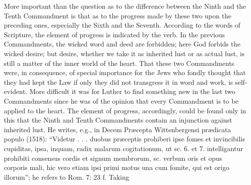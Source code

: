 More important than the question as to the difference between the Ninth and the Tenth Commandment is that as to the progress made by these two upon the preceding ones, especially the Sixth and the Seventh. According to the words of Scripture, the element of progress is indicated by the verb. In the previous Commandments, the wicked word and deed are forbidden; here God forbids the wicked desire; but desire, whether we take it as inherited lust or as actual lust, is still a matter of the inner world of the heart. That these two Commandments were, in consequence, of special importance for the Jews who fondly thought that they had kept the Law if only they did not transgress it in word and work, is self-evident. More difficult it was for Luther to find something new in the last two Commandments since he was of the opinion that every Commandment is to be applied to the heart. The element of progress, accordingly, could be found only in this that the Ninth and Tenth Commandments contain an injunction against inherited lust. He writes, e.g., in Decem Præcepta Wittenbergensi prædicata populo (1518): “Videtur . . . duobus præceptis prohiberi ipse fomes et invincibilis cupiditas, ipsa, inquam, radix malarum cogitationum, ut sc. 6. et 7. intelligantur prohibiti consensus cordis et signum membrorum, sc. verbum oris et opus corporis mali, hic vero etiam ipsi primi motus una cum fomite, qui est origo illorum”; he refers to Rom. 7: 23 f. Taking
